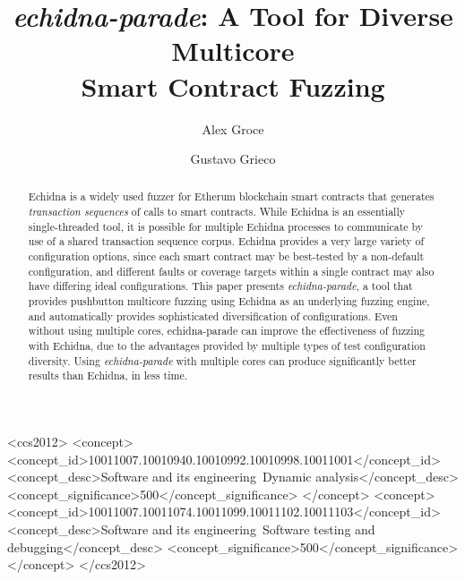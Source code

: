 \documentclass[sigconf]{acmart}
\begin{document}
\title{\emph{echidna-parade}: A Tool for Diverse Multicore\\Smart Contract Fuzzing}

\author{Alex Groce}
\author{Gustavo Grieco}


\renewcommand{\shortauthors}{Groce and Grieco}

\begin{abstract}
Echidna is a widely used fuzzer for Etherum blockchain smart
contracts that generates \emph{transaction sequences} of calls to smart contracts.  While Echidna is an essentially single-threaded tool, it
is possible for multiple Echidna processes to communicate by use of a shared
transaction sequence corpus.  Echidna provides a very large variety of configuration
options, since each smart contract may be best-tested by a non-default
configuration, and different faults or coverage targets within a
single contract may also have differing ideal configurations.  This
paper presents \emph{echidna-parade}, a tool that provides pushbutton
multicore fuzzing using Echidna as an underlying fuzzing engine, and
automatically provides sophisticated diversification of
configurations.   Even without using multiple cores, echidna-parade
can improve the effectiveness of fuzzing with Echidna,
due to the advantages provided by multiple types of test configuration
diversity.  Using \emph{echidna-parade} with multiple cores can
produce significantly better results than Echidna, in less time.
\end{abstract}

\begin{CCSXML}
<ccs2012>
<concept>
<concept_id>10011007.10010940.10010992.10010998.10011001</concept_id>
<concept_desc>Software and its engineering~Dynamic analysis</concept_desc>
<concept_significance>500</concept_significance>
</concept>
<concept>
<concept_id>10011007.10011074.10011099.10011102.10011103</concept_id>
<concept_desc>Software and its engineering~Software testing and debugging</concept_desc>
<concept_significance>500</concept_significance>
</concept>
</ccs2012>
\end{CCSXML}
\end{document}
